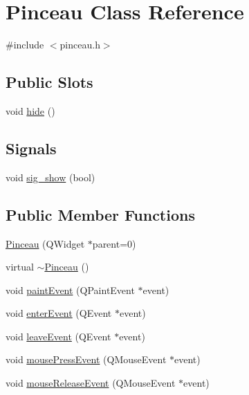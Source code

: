 \hypertarget{class_pinceau}{\section{\-Pinceau \-Class \-Reference}
\label{class_pinceau}
}


{\ttfamily \#include $<$pinceau.\-h$>$}

\subsection*{\-Public \-Slots}
\begin{DoxyCompactItemize}
\item 
void \hyperlink{class_pinceau_ad3b17fafb09337792651808f49d1bbf6}{hide} ()
\end{DoxyCompactItemize}
\subsection*{\-Signals}
\begin{DoxyCompactItemize}
\item 
void \hyperlink{class_pinceau_aa055a6a5089a35c06795bafca9a63d93}{sig\-\_\-show} (bool)
\end{DoxyCompactItemize}
\subsection*{\-Public \-Member \-Functions}
\begin{DoxyCompactItemize}
\item 
\hyperlink{class_pinceau_ae50676ed7dff22d8490348ede63478d6}{\-Pinceau} (\-Q\-Widget $\ast$parent=0)
\item 
virtual \hyperlink{class_pinceau_a2b3f9ebe5213d32306a45244da5e7ef2}{$\sim$\-Pinceau} ()
\item 
void \hyperlink{class_pinceau_af72110300f2df8f90c3c95589d640d50}{paint\-Event} (\-Q\-Paint\-Event $\ast$event)
\item 
void \hyperlink{class_pinceau_a1a342bba7e6a2cd1626430dcc06c6a07}{enter\-Event} (\-Q\-Event $\ast$event)
\item 
void \hyperlink{class_pinceau_a77fe16191c682dc2f2509941dbcf743b}{leave\-Event} (\-Q\-Event $\ast$event)
\item 
void \hyperlink{class_pinceau_aa5cceec03c9fe3696573aefcf26cbf38}{mouse\-Press\-Event} (\-Q\-Mouse\-Event $\ast$event)
\item 
void \hyperlink{class_pinceau_affbf8ebc2d9985d61e70151cb039aa41}{mouse\-Release\-Event} (\-Q\-Mouse\-Event $\ast$event)
\end{DoxyCompactItemize}
